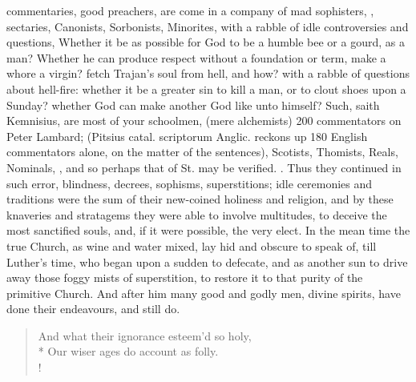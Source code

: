 {commentaries, good preachers, are come in a company of mad sophisters,
, sectaries, Canonists, Sorbonists, Minorites,
with a rabble of idle controversies and questions,   Whether it
be as possible for God to be a humble bee or a gourd, as a man? Whether
he can produce respect without a foundation or term, make a whore a
virgin? fetch Trajan's soul from hell, and how? with a rabble of
questions about hell-fire: whether it be a greater sin to kill a man,
or to clout shoes upon a Sunday? whether God can make another God like
unto himself? Such, saith Kemnisius, are most of your schoolmen, (mere
alchemists) 200 commentators on Peter Lambard; (Pitsius \textlatin{catal.
scriptorum Anglic.} reckons up 180 English commentators alone, on the
matter of the sentences), Scotists, Thomists, Reals, Nominals, \etc{}, and
so perhaps that of St. \Austin{} may be verified. . Thus they continued in
such error, blindness, decrees, sophisms, superstitions; idle
ceremonies and traditions were the sum of their new-coined holiness and
religion, and by these knaveries and stratagems they were able to
involve multitudes, to deceive the most sanctified souls, and, if it
were possible, the very elect. In the mean time the true Church, as
wine and water mixed, lay hid and obscure to speak of, till Luther's
time, who began upon a sudden to defecate, and as another sun to drive
away those foggy mists of superstition, to restore it to that purity of
the primitive Church. And after him many good and godly men, divine
spirits, have done their endeavours, and still do.

\begin{verse}%
And what their ignorance esteem'd so holy,\\*
Our wiser ages do account as folly.\\!
\end{verse}%

}

